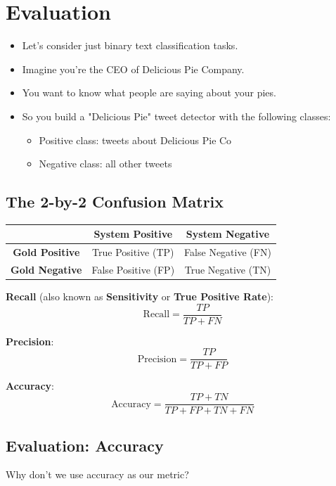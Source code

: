 \documentclass{book}
\begin{document}
\section{Evaluation}

\begin{itemize}
 \item Let's consider just binary text classification tasks. 
 \item Imagine you're the CEO of Delicious Pie Company. 
\item You want to know what people are saying about your pies. 
\item So you build a "Delicious Pie" tweet detector with the following classes:
\begin{itemize}
\item Positive class: tweets about Delicious Pie Co
\item Negative class: all other tweets
\end{itemize}
\end{itemize}



\subsection{The 2-by-2 Confusion Matrix}
\begin{table}[h]
\centering
\begin{tabular}{|c|c|c|}
\hline
\textbf{} & \textbf{System Positive} & \textbf{System Negative} \\
\hline
\textbf{Gold Positive} & True Positive (TP) & False Negative (FN) \\
\hline
\textbf{Gold Negative} & False Positive (FP) & True Negative (TN) \\
\hline
\end{tabular}
\end{table}

\textbf{Recall} (also known as \textbf{Sensitivity} or \textbf{True Positive Rate}):
\[ \text{Recall} = \frac{TP}{TP + FN} \]

\textbf{Precision}:
\[ \text{Precision} = \frac{TP}{TP + FP} \]

\textbf{Accuracy}:
\[ \text{Accuracy} = \frac{TP + TN}{TP + FP + TN + FN} \]


\subsection{Evaluation: Accuracy}
Why don't we use accuracy as our metric?
\end{document}
